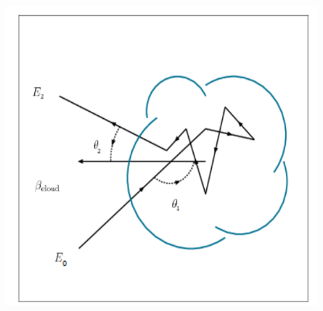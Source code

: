 \begin{frame}{}
\begin{columns}
            \begin{column}{0.4\textwidth} %
                \includegraphics[width=0.9\textwidth]{Figures/fermisecondorder.png}
            \end{column}
        \end{columns}
    \end{frame}
    
